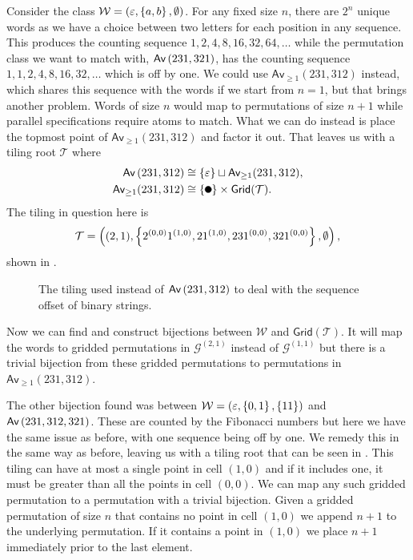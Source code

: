 Consider the class $\mathcal{W} = (\varepsilon, \left\{a,b\right\}, \emptyset)$. For any fixed size $n$, there are $2^n$ unique words as we have a choice between two letters for each position in any sequence. This produces the counting sequence $1, 2, 4, 8, 16, 32, 64, \dotsc$ while the permutation class we want to match with, $\textsf{Av}\left(231,321\right)$, has the counting sequence $1, 1, 2, 4, 8, 16, 32, \dotsc$ which is off by one. We could use $\textsf{Av}_{\geq1}(231,312)$ instead, which shares this sequence with the words if we start from $n=1$, but that brings another problem. Words of size $n$ would map to permutations of size $n+1$ while parallel specifications require atoms to match. What we can do instead is place the topmost point of $\textsf{Av}_{\geq1}(231,312)$ and factor it out. That leaves us with a tiling root $\mathcal{T}$ where
\begin{align*}
    \Av{231,312} &\cong \set{\varepsilon} \sqcup \textsf{Av}_{\geq1}(231,312),\\
    \textsf{Av}_{\geq1}(231,312) &\cong \set{\point{0.1}}\times \textsf{Grid}(\mathcal{T}).
\end{align*}
The tiling in question here is
\[
    \mathcal{T} = \left((2,1), \left\{2^{(0,0)}1^{(1,0)}, 21^{(1,0)}, 231^{(0,0)}, 321^{(0,0)}\right\},\emptyset\right),
\]
shown in .
\begin{figure}[ht!]
    \centering
    
    \caption{The tiling used instead of $\textsf{Av}\left(231,312\right)$ to deal with the sequence offset of binary strings.}
    \label{fig:wordtiling}
\end{figure}
Now we can find and construct bijections between $\mathcal{W}$ and $\textsf{Grid}(\mathcal{T})$. It will map the words to gridded permutations in $\mathcal{G}^{(2,1)}$ instead of $\mathcal{G}^{(1,1)}$ but there is a trivial bijection from these gridded permutations to permutations in $\textsf{Av}_{\geq1}(231,312)$.

The other bijection found was between $\mathcal{W} = (\varepsilon, \left\{0,1\right\}, \left\{11\right\})$ and $\textsf{Av}\left(231,312,321\right)$. These are counted by the Fibonacci numbers but here we have the same issue as before, with one sequence being off by one. We remedy this in the same way as before, leaving us with a tiling root that can be seen in . This tiling can have at most a single point in cell $(1,0)$ and if it includes one, it must be greater than all the points in cell $(0,0)$. We can map any such gridded permutation to a permutation with a trivial bijection. Given a gridded permutation of size $n$ that contains no point in cell $(1,0)$ we append $n+1$ to the underlying permutation. If it contains a point in $(1,0)$ we place $n+1$ immediately prior to the last element.

